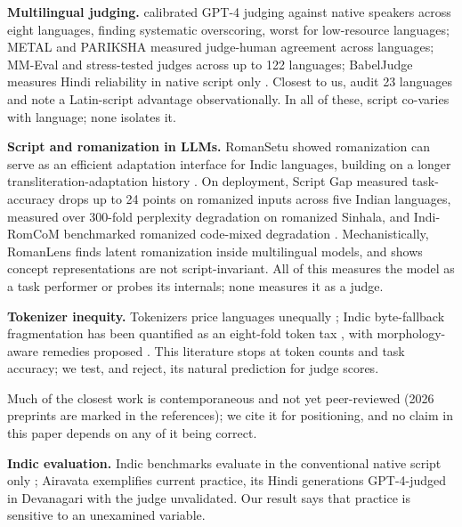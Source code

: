 \textbf{Multilingual judging.} \citet{hada2024evaluators} calibrated GPT-4 judging against native speakers across eight languages, finding systematic overscoring, worst for low-resource languages; METAL \citep{hada2024metal} and PARIKSHA \citep{watts2024pariksha} measured judge-human agreement across languages; MM-Eval \citep{son2024mmeval} and \citet{fu2025reliable} stress-tested judges across up to 122 languages; BabelJudge \citep{kc2026babeljudge} measures Hindi reliability in native script only \citep[see also][]{zubiaga2026multilingualjudge}. Closest to us, \citet{zhou2026lower} audit 23 languages and note a Latin-script advantage observationally. In all of these, script co-varies with language; none isolates it.

\textbf{Script and romanization in LLMs.} RomanSetu \citep{husain2024romansetu} showed romanization can serve as an efficient adaptation interface for Indic languages, building on a longer transliteration-adaptation history \citep{purkayastha2023romanization, xhelili2024breaking, madhani2023aksharantar}. On deployment, Script Gap \citep{khullar2025scriptgap} measured task-accuracy drops up to 24 points on romanized inputs across five Indian languages, \citet{rajapakse2026sinhala} measured over 300-fold perplexity degradation on romanized Sinhala, and Indi-RomCoM \citep{das2026indiromcom} benchmarked romanized code-mixed degradation \citep[resources:][]{sheth2025comilingua, yang2025codemixbench}. Mechanistically, RomanLens \citep{saji2025romanlens} finds latent romanization inside multilingual models, and \citet{karne2026onelanguage} shows concept representations are not script-invariant. All of this measures the model as a task performer or probes its internals; none measures it as a judge.

\textbf{Tokenizer inequity.} Tokenizers price languages unequally \citep{petrov2023tokenizers, ahia2023costs, ali2024tokenizer, liang2023xlmv}; Indic byte-fallback fragmentation has been quantified as an eight-fold token tax \citep{srivastava2026tokenizertax}, with morphology-aware remedies proposed \citep{limisiewicz2024myte, brahma2025morphtok}. This literature stops at token counts and task accuracy; we test, and reject, its natural prediction for judge scores.

Much of the closest work is contemporaneous and not yet peer-reviewed (2026 preprints are marked in the references); we cite it for positioning, and no claim in this paper depends on any of it being correct.

\textbf{Indic evaluation.} Indic benchmarks evaluate in the conventional native script only \citep{ahuja2023mega, doddapaneni2023indicxtreme, singh2024indicgenbench, verma2024milu}; Airavata \citep{gala2024airavata} exemplifies current practice, its Hindi generations GPT-4-judged in Devanagari with the judge unvalidated. Our result says that practice is sensitive to an unexamined variable.

